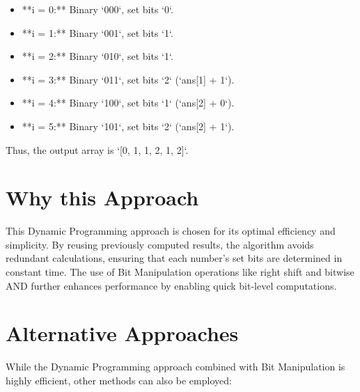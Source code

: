\begin{itemize}
    \item **i = 0:** Binary `000`, set bits `0`.
    \item **i = 1:** Binary `001`, set bits `1`.
    \item **i = 2:** Binary `010`, set bits `1`.
    \item **i = 3:** Binary `011`, set bits `2` (`ans[1] + 1`).
    \item **i = 4:** Binary `100`, set bits `1` (`ans[2] + 0`).
    \item **i = 5:** Binary `101`, set bits `2` (`ans[2] + 1`).
\end{itemize}

Thus, the output array is `[0, 1, 1, 2, 1, 2]`.

\section*{Why this Approach}

This Dynamic Programming approach is chosen for its optimal efficiency and simplicity. By reusing previously computed results, the algorithm avoids redundant calculations, ensuring that each number's set bits are determined in constant time. The use of Bit Manipulation operations like right shift and bitwise AND further enhances performance by enabling quick bit-level computations.

\section*{Alternative Approaches}

While the Dynamic Programming approach combined with Bit Manipulation is highly efficient, other methods can also be employed:

